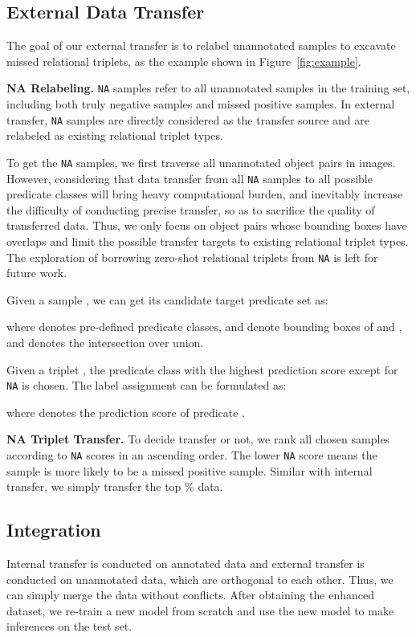 \documentclass[runningheads]{llncs}
\begin{document}
\subsection{External Data Transfer}
The goal of our external transfer is to relabel unannotated samples to excavate missed relational triplets, as the example shown in Figure~\ref{fig:example}.

\smallskip
\noindent
\textbf{NA Relabeling.}
\texttt{NA} samples refer to all unannotated samples in the training set, including both truly negative samples and missed positive samples.
In external transfer, \texttt{NA} samples are directly considered as the transfer source and are relabeled as existing relational triplet types.

To get the \texttt{NA} samples, we first traverse all unannotated object pairs in images. 
However, considering that data transfer from all \texttt{NA} samples to all possible predicate classes will bring heavy computational burden, and inevitably increase the difficulty of conducting precise transfer, so as to sacrifice the quality of  transferred data.
Thus, we only focus on object pairs whose bounding boxes have overlaps and limit the possible transfer targets to existing relational triplet types.
The exploration of borrowing zero-shot relational triplets from \texttt{NA} is left for future work.

Given a sample , we can get its candidate target predicate set as:

where  denotes pre-defined predicate classes,  and  denote bounding boxes of  and , and  denotes the intersection over union.

Given a triplet , the predicate class with the highest prediction score except for \texttt{NA} is chosen.
The label assignment can be formulated as:

where  denotes the prediction score of predicate .

\smallskip
\noindent
\textbf{NA Triplet Transfer.}
To decide transfer or not, we rank all chosen  samples according to \texttt{NA} scores in an ascending order.
The lower \texttt{NA} score means the sample is more likely to be a missed positive sample. 
Similar with internal transfer, we simply transfer the top \% data.


\subsection{Integration}
Internal transfer is conducted on annotated data and external transfer is conducted on unannotated data, which are orthogonal to each other.
Thus, we can simply merge the data without conflicts.
After obtaining the enhanced dataset, we re-train a new model from scratch and use the new model to make inferences on the test set.
\end{document}

